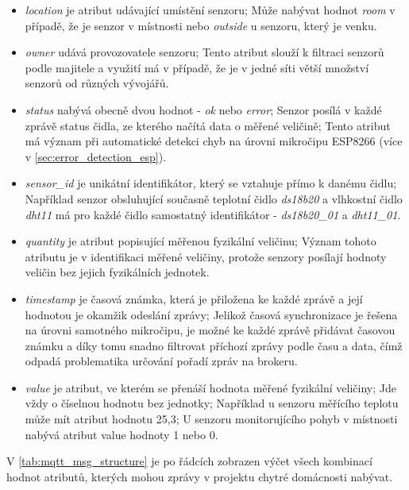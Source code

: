 \begin{itemize}
  \item \textit{location} je atribut udávající umístění senzoru; Může nabývat hodnot \textit{room} v případě, že je senzor v místnosti nebo \textit{outside} u senzoru, který je venku.
  \item \textit{owner} udává provozovatele senzoru; Tento atribut slouží k filtraci senzorů podle majitele a využití má v případě, že je v jedné síti větší množství senzorů od různých vývojářů.
  \item \textit{status} nabývá obecně dvou hodnot - \textit{ok} nebo \textit{error}; Senzor posílá v každé zprávě status čidla, ze kterého načítá data o měřené veličině; Tento atribut má význam při automatické detekci chyb na úrovni mikročipu ESP8266 (více v \cref{sec:error_detection_esp}). 
  \item \textit{sensor\_id} je unikátní identifikátor, který se vztahuje přímo k danému čidlu; Například senzor obsluhující současně teplotní čidlo \textit{ds18b20} a vlhkostní čidlo \textit{dht11} má pro každé čidlo samostatný identifikátor - \textit{ds18b20\_01} a \textit{dht11\_01}. 
  \item \textit{quantity} je atribut popisující měřenou fyzikální veličinu; Význam tohoto atributu je v identifikaci měřené veličiny, protože senzory posílají hodnoty veličin bez jejich fyzikálních jednotek.  
  \item \textit{timestamp} je časová známka, která je přiložena ke každé zprávě a její hodnotou je okamžik odeslání zprávy; Jelikož časová synchronizace je řešena na úrovni samotného mikročipu, je možné ke každé zprávě přidávat časovou známku a díky tomu snadno filtrovat příchozí zprávy podle času a data, čímž odpadá problematika určování pořadí zpráv na brokeru.   
  \item \textit{value} je atribut, ve kterém se přenáší hodnota měřené fyzikální veličiny; Jde vždy o číselnou hodnotu bez jednotky; Například u senzoru měřícího teplotu může mít atribut hodnotu 25,3; U senzoru monitorujícího pohyb v místnosti nabývá atribut value hodnoty 1 nebo 0.  
\end{itemize}

V \cref{tab:mqtt_msg_structure} je po řádcích zobrazen výčet všech kombinací hodnot atributů, kterých mohou zprávy v projektu chytré domácnosti nabývat.  

\newpage

